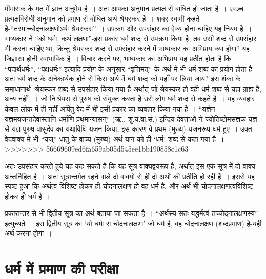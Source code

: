 मीमांसक के मत में ज्ञान अनुमेय है~। अतः आपका अनुमान प्रत्यक्ष से बाधित हो जाता है~। एवञ्च प्रत्यक्षविरोधी अनुमान को प्रमाण से बोधित अर्थ श्रेयस्कर है~। शबर स्वामी कहते है-“तस्माच्चोदनालक्षणोऽर्थः श्रेयस्करः”~। उपक्रम और उपसंहार का ऐक्य होना चाहिए यह नियम है~। भाष्यकार ने “को धर्मः, कथं लक्षणः”-इस प्रकार धर्म शब्द से उपक्रम किया है, तब उसी शब्द से उपसंहार भी करना चाहिए था, किन्तु श्रेयस्कर शब्द से उपसंहार करने में भाष्यकार का अभिप्राय क्या होगा? यह जिज्ञासा होनी स्वाभाविक है~। विचार करने पर, भाष्यकार का अभिप्राय यह प्रतीत होता है कि “पदार्थधर्मः”, “पक्षधर्मः” इत्यादि प्रयोग के अनुसार “वृत्तिमत्” के अर्थ में भी धर्म शब्द का प्रयोग होता है~। अतः धर्म शब्द के अनेकार्थक होने से किस अर्थ में धर्म शब्द को यहाँ पर लिया जाय? इस शंका के समाधानार्थ ‘श्रेयस्कर शब्द से उपसंहार किया गया है अर्थात् जो श्रेयस्कर हो वही धर्म शब्द से यहा ग्राह्य है, अन्य नहीं ~। जो निःश्रेयस से पुरुष को संयुक्त करता है उसे लोग धर्म शब्द से कहते है~। यह व्यवहार केवल लोक में ही नहीं अपितु वेद में भी इसी प्रकार का व्यवहार किया गया है~। “यज्ञेन यज्ञमयजन्तदेवास्तानि धर्माणि प्रथमान्यासन्” (ऋ., शु.य.वा.सं.) इन्द्रिय देवताओं ने ज्योतिष्टोमसंज्ञक यज्ञ से यज्ञ पुरुष वासुदेव का यथाविधि यजन किया, इस कारण वे प्रथम (मुख्य) यजनरूप धर्म हुए~। उक्त वेदवाक्य में भी “यज्” धातु के वाच्य (मुख्य) अर्थ याग को ही ‘धर्म' शब्द से कहा गया है~।
>>>>>>> 56669609ed6fa659ab05d545ee1bb190858c1c63

अतः उपसंहार करते हुये यह कह सकते है कि यह सूत्र वाक्यद्वयरूप है, अर्थात् इस एक सूत्र में दो वाक्य अन्तर्निहित है~। अतः सूत्रान्तर्गत रहने वाले दो वाक्यो से ही दो अर्थो की प्रतीति हो रही है~। इससे यह स्पष्ट हुआ कि अर्थत्व विशिष्ट होकर ही चोदनालक्षण हो वह धर्म है, और अर्थ भी चोदनालक्षणत्वविशिष्ट होकर ही धर्म है~।

प्रकारान्तर से भी द्वितीय सूत्र का अर्थ बताया जा सकता है~। “अर्थस्य सतः यद्धर्मत्वं तच्चोदनालक्षणस्य” इत्युच्यते~। इस द्वितीय सूत्र का ‘यो धर्मः स चोदनालक्षणः' जो धर्म है, वह चोदनालक्षण (शब्दप्रमाण) है-यही अर्थ करना होगा~।


\section*{धर्म में प्रमाण की परीक्षा}

